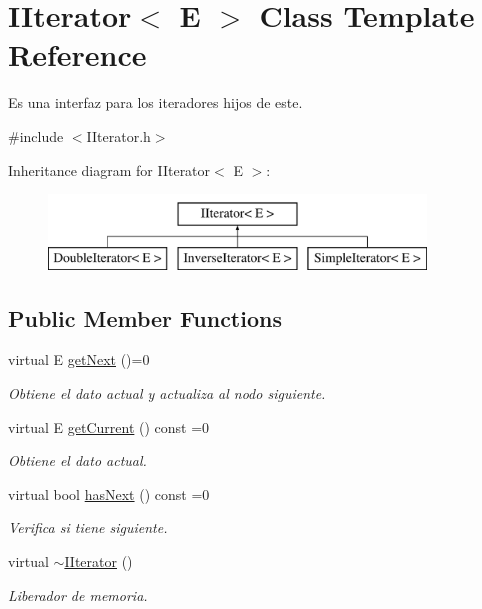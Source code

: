 \hypertarget{class_i_iterator}{\section{I\-Iterator$<$ E $>$ Class Template Reference}
\label{class_i_iterator}
}


Es una interfaz para los iteradores hijos de este.  




{\ttfamily \#include $<$I\-Iterator.\-h$>$}

Inheritance diagram for I\-Iterator$<$ E $>$\-:\begin{figure}[H]
\begin{center}
\leavevmode
\includegraphics[height=2.000000cm]{class_i_iterator}
\end{center}
\end{figure}
\subsection*{Public Member Functions}
\begin{DoxyCompactItemize}
\item 
virtual E \hyperlink{class_i_iterator_ab1b13434e4fac20c74262dee51d1e870}{get\-Next} ()=0
\begin{DoxyCompactList}\small\item\em Obtiene el dato actual y actualiza al nodo siguiente. \end{DoxyCompactList}\item 
virtual E \hyperlink{class_i_iterator_a50f55ce1381378aad2c93f16c9b60822}{get\-Current} () const =0
\begin{DoxyCompactList}\small\item\em Obtiene el dato actual. \end{DoxyCompactList}\item 
virtual bool \hyperlink{class_i_iterator_a8a73f0fb41a66fe98e5e636378759196}{has\-Next} () const =0
\begin{DoxyCompactList}\small\item\em Verifica si tiene siguiente. \end{DoxyCompactList}\item 
\hypertarget{class_i_iterator_a46e00fa31d4f8d29232f4b1dfc27026b}{virtual \hyperlink{class_i_iterator_a46e00fa31d4f8d29232f4b1dfc27026b}{$\sim$\-I\-Iterator} ()}\label{class_i_iterator_a46e00fa31d4f8d29232f4b1dfc27026b}

\begin{DoxyCompactList}\small\item\em Liberador de memoria. \end{DoxyCompactList}\end{DoxyCompactItemize}


